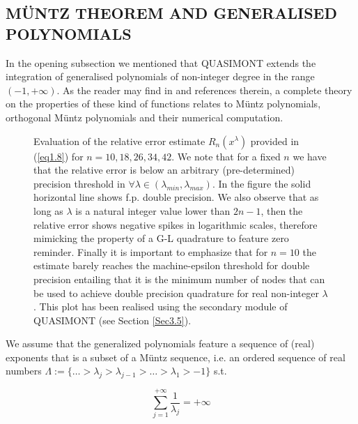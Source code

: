 \documentclass[a4paper, twosided]{book}
\begin{document}
\subsection[Müntz theorem and generalised polynomials]{\changefont MÜNTZ THEOREM AND GENERALISED POLYNOMIALS }\label{SubSec1.2.4}

In the opening subsection we mentioned that QUASIMONT extends the integration of generalised polynomials of non-integer degree in the range $(-1,+\infty)$. As the reader may find in \cite{Lombardi09} and references therein, a complete theory on the properties of these kind of functions relates to Müntz polynomials, orthogonal Müntz polynomials and their numerical computation. 

\newpage
\begin{center}
        \begin{figure}[t]
        \captionsetup{singlelinecheck=off}
        
        \caption{Evaluation of the relative error estimate $R_n(x^{\lambda})$ provided in (\ref{eq1.8}) for $n=10,18,26,34,42$. We note that for a fixed $n$ we have that the relative error is  below an arbitrary (pre-determined) precision threshold in  $\forall\lambda\in(\lambda_{min},\lambda_{max})$. In the figure the solid horizontal line shows f.p. double precision.  We also observe that as long as $\lambda$ is a natural integer value lower than $2n-1$, then the relative error shows negative spikes in logarithmic scales, therefore mimicking the property of a G-L quadrature to feature zero reminder. Finally it is important to emphasize that for $n=10$ the estimate barely reaches the machine-epsilon threshold for double precision entailing that it is the minimum number of nodes that can be used to achieve double precision quadrature for real non-integer $\lambda$. This plot has been realised using the secondary module of QUASIMONT (see Section \ref{Sec3.5}).}
        \label{Fig1.1}
        \end{figure}
\end{center}

\noindent
We assume that the generalized polynomials feature a sequence of (real) exponents that is a subset of a Müntz sequence, i.e. an ordered sequence of real numbers $\Lambda:=\{\dots>\lambda_j>\lambda_{j-1}>\dots>\lambda_1>-1\}$ s.t.

\begin{equation}\label{eq1.10}
    \sum_{j=1}^{+\infty}\frac{1}{\lambda_j}=+\infty
\end{equation}
\end{document}
